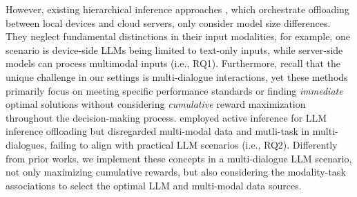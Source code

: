 However, existing hierarchical inference approaches \cite{al2024regret, beytur2024optimization}, which orchestrate offloading between local devices and cloud servers, only consider model size differences. They neglect fundamental distinctions in their input modalities, for example, one scenario is device-side LLMs being limited to text-only inputs, while server-side models can process multimodal inputs (i.e., RQ1). Furthermore, recall that the unique challenge in our settings is multi-dialogue interactions, yet these methods primarily focus on meeting specific performance standards or finding \textit{immediate} optimal solutions without considering \textit{cumulative} reward maximization throughout the decision-making process. \cite{he2024large} employed active inference for LLM inference offloading but disregarded multi-modal data and mutli-task in multi-dialogues, failing to align with practical LLM scenarios (i.e., RQ2). Differently from prior works, we implement these concepts in a multi-dialogue LLM scenario, not only maximizing cumulative rewards, but also considering the modality-task associations to select the optimal LLM and multi-modal data sources.